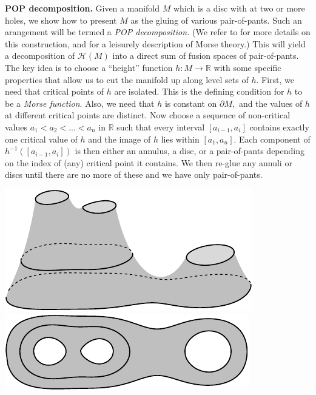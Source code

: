 \documentclass[aps, prl, letterpaper, twocolumn, superscriptaddress, notitlepage, 10pt]{revtex4-1}
\newcommand{\F}{\mathscr{H}} %
\newcommand{\R}{\mathbb{R}}
\newcommand{\subsub}[1]{{\bf #1}}
\begin{document}
\subsub{POP decomposition.}
Given a manifold $M$ which is
a disc with at two or more holes, 
we show how to present $M$ as the gluing of various
pair-of-pants. Such an arangement will be termed a \emph{POP decomposition.}
(We refer to \cite{Ivanov2001} for more details on this construction,
and \cite{Ghrist2014} for a leisurely description of Morse theory.)
This will yield a decomposition of $\F(M)$ into a direct
sum of fusion spaces of pair-of-pants. %
The key idea is to choose a ``height'' function $h:M\to\R$
with some specific properties that allow us to
cut the manifold up along level sets of $h.$
First, we need that critical points of $h$ are isolated.
This is the defining condition for $h$ to be a \emph{Morse function}.
Also, we need that $h$ is constant on $\partial M,$
and the values of $h$ at different critical points are distinct.
Now choose a sequence of non-critical values $a_1<a_2<...<a_n$ in $\R$
such that every interval $[a_{i-1}, a_i]$ 
contains exactly one critical value of $h$ and the image
of $h$ lies within $[a_1, a_n].$
Each component of $h^{-1}([a_{i-1}, a_i])$ is then either
an annulus, a disc, or a pair-of-pants depending on the index of (any)
critical point it contains.
We then re-glue any annuli or discs until there are no more of these
and we have only pair-of-pants. 
\begin{center}
\includegraphics[]{pic-pants.pdf}\ \ \ \ \ \ \ \ \includegraphics[]{pic-pants-1.pdf}
\end{center}
\end{document}
